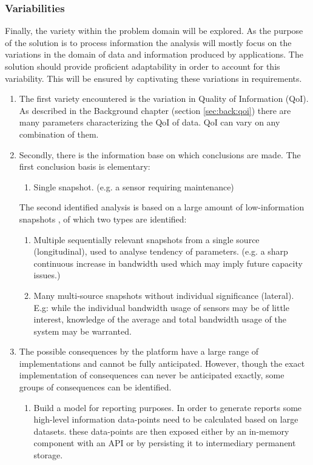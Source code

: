 \subsubsection*{Variabilities}
Finally, the variety within the problem domain will be explored. As the purpose of the solution is to process information the analysis will mostly focus on the variations in the domain of data and information produced by applications. The solution should provide proficient adaptability in order to account for this variability. This will be ensured by captivating these variations in requirements.
\begin{enumerate}[label=V\archid .\arabic*]
\nospace
\item \label{v:qoi} The first variety  encountered is the variation in Quality of Information (QoI). As described in the Background chapter (section \ref{sec:back:qoi}) there are many parameters characterizing the QoI of data. QoI can vary on any combination of them.
\item \label{v:conclusion_basis} Secondly, there is the information base on which conclusions are made. The first conclusion basis is elementary:
\begin{enumerate}
\nospace
\item Single snapshot. (e.g. a sensor requiring maintenance)
\end{enumerate}
The second identified analysis is based on a large amount of low-information snapshots \cite{qos_difficult}, of which two types are identified:
\begin{enumerate}[resume]
\item Multiple sequentially relevant snapshots from a single source (longitudinal), used to analyse tendency of parameters. (e.g. a sharp continuous increase in bandwidth used which may imply future capacity issues.)
\item Many multi-source snapshots without individual significance (lateral). E.g: while the individual bandwidth usage of sensors may be of little interest, knowledge of the average and total bandwidth usage of the system may be warranted.
\end{enumerate}
\item \label{v:consequence} The possible consequences by the platform have a large range of implementations and cannot be fully anticipated. However, though the exact implementation of consequences can never be anticipated exactly, some groups of consequences can be identified.
\begin{enumerate}
\nospace
\item Build a model for reporting purposes. In order to generate reports some high-level information data-points need to be calculated based on large datasets. these data-points are then exposed either by an in-memory component with an API or by persisting it to intermediary permanent storage.

\end{enumerate}
\end{enumerate}
